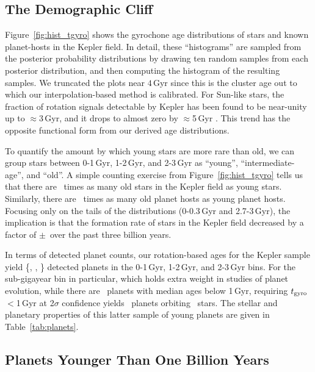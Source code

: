 \documentclass[11pt,twocolumn,tighten]{aastex63}
\begin{document}
\subsection{The Demographic Cliff}

Figure~\ref{fig:hist_tgyro} shows the gyrochone age distributions of
stars and known planet-hosts in the Kepler field.  In detail, these
``histograms'' are sampled from the posterior probability
distributions by drawing ten random samples from each posterior
distribution, and then computing the histogram of the resulting
samples.  We truncated the plots near $4$\,Gyr since this is the
cluster age out to which our interpolation-based method is calibrated.
For Sun-like stars, the fraction of rotation signals detectable by
Kepler has been found to be near-unity up to $\approx$3\,Gyr, and it
drops to almost zero by $\approx$5\,Gyr \citep{2022ApJ...937...94M}.
This trend has the opposite functional form from our derived age
distributions.

To quantify the amount by which young stars are more rare than old, we
can group stars between 0-1\,Gyr, 1-2\,Gyr, and 2-3\,Gyr as ``young'',
``intermediate-age'', and ``old''.  A simple counting exercise from
Figure~\ref{fig:hist_tgyro} tells us that there are \ratioobtoybstars\
times as many old stars in the Kepler field as young stars.
Similarly, there are \ratioobtoybplanets\ times as many old planet
hosts as young planet hosts.  Focusing only on the tails of the
distributions (0-0.3\,Gyr and 2.7-3\,Gyr), the implication is that the
formation rate of stars in the Kepler field decreased by a factor of
\ratiosfr$\pm$\uncratiosfr\ over the past three billion years.

In terms of detected planet counts, our rotation-based ages for the
Kepler sample yield \{\nplyounggyro, \nplmidgyro, \nploldgyro\}
detected planets in the 0-1\,Gyr, 1-2\,Gyr, and 2-3\,Gyr bins.  For
the sub-gigayear bin in particular, which holds extra weight in
studies of planet evolution, while there are \nplyounggyro\ planets
with median ages below 1\,Gyr, requiring $t_{\rm gyro}$$<$1\,Gyr at
2$\sigma$ confidence yields \nplyounggyrotwosigma\ planets orbiting
\nplhostsyounggyrotwosigma\ stars.  The stellar and planetary
properties of this latter sample of young planets are given in
Table~\ref{tab:planets}.


\subsection{Planets Younger Than One Billion Years}
\end{document}
